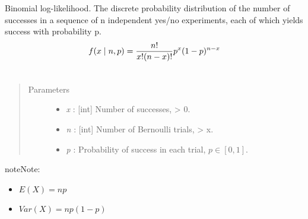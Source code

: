 \documentclass[letterpaper,10pt,english]{sphinxmanual}
\begin{document}

\begin{fulllineitems}
\label{distributions:pymc.distributions.binomial_like}
Binomial log-likelihood.  The discrete probability distribution of the
number of successes in a sequence of n independent yes/no experiments,
each of which yields success with probability p.
\begin{gather}
\begin{split}f(x \mid n, p) = \frac{n!}{x!(n-x)!} p^x (1-p)^{n-x}\end{split}\notag\\\begin{split}\end{split}\notag
\end{gather}\begin{quote}\begin{description}
\item[{Parameters }] \leavevmode\begin{itemize}
\item {} 
\emph{x} : {[}int{]} Number of successes, \textgreater{} 0.

\item {} 
\emph{n} : {[}int{]} Number of Bernoulli trials, \textgreater{} x.

\item {} 
\emph{p} : Probability of success in each trial, $p \in [0,1]$.

\end{itemize}

\end{description}\end{quote}

\begin{notice}{note}{Note:}\begin{itemize}
\item {} 
$E(X)=np$

\item {} 
$Var(X)=np(1-p)$

\end{itemize}
\end{notice}

\end{fulllineitems}

\end{document}
